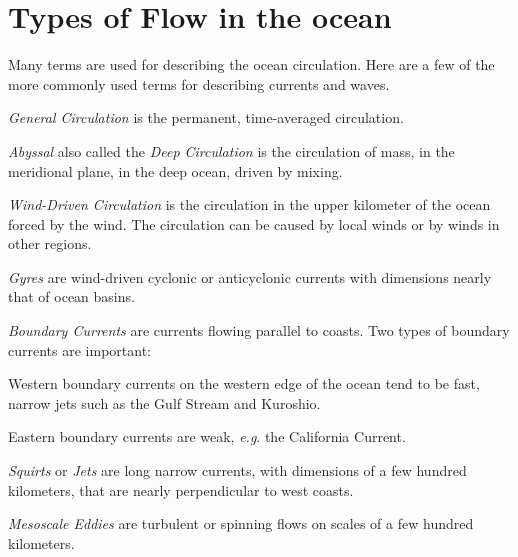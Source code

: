\section{Types of Flow in the ocean}
Many terms are used for describing the ocean
circulation. Here are a few of the more commonly used terms for
describing currents and waves.
\begin{enumerate}

\vitem\textit{General Circulation} is the permanent, time-averaged circulation.

\vitem\textit{Abyssal} also called
the \textit{Deep Circulation} is the
circulation of mass, in the meridional plane, in the deep ocean,
driven by mixing.

\vitem\textit{Wind-Driven Circulation} is the circulation in the upper kilometer of the
ocean forced by the wind. The circulation can be caused by local winds
or by winds in other regions.

\vitem\textit{Gyres} are wind-driven cyclonic or
anticyclonic currents with dimensions nearly that of ocean basins.

\vitem\textit{Boundary Currents} are
currents flowing parallel to coasts. Two types of boundary currents
are important:
\begin{itemize}
\vitem Western boundary currents on the western edge of the ocean tend
to be fast, narrow jets such as the Gulf Stream and Kuroshio.

\vitem Eastern boundary currents are weak, \textit{e.g}. the
California Current.
\end{itemize}

\vitem\textit{Squirts} or \textit{Jets}
are long narrow currents, with dimensions of a few
hundred kilometers, that are nearly perpendicular to west coasts.

\vitem\textit{Mesoscale Eddies} are
turbulent or spinning flows on scales of a few hundred kilometers.
\end{enumerate}
\vspace{-0.5ex}

